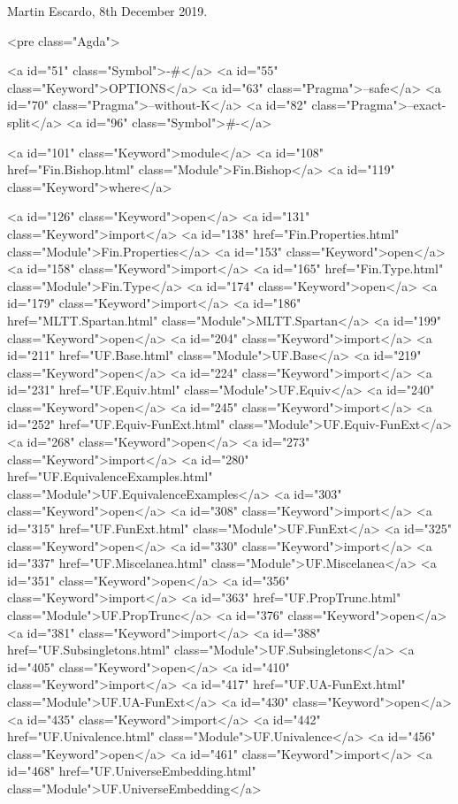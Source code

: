 Martin Escardo, 8th December 2019.

<pre class="Agda">

<a id="51" class="Symbol">{-#</a> <a id="55" class="Keyword">OPTIONS</a> <a id="63" class="Pragma">--safe</a> <a id="70" class="Pragma">--without-K</a> <a id="82" class="Pragma">--exact-split</a> <a id="96" class="Symbol">#-}</a>

<a id="101" class="Keyword">module</a> <a id="108" href="Fin.Bishop.html" class="Module">Fin.Bishop</a> <a id="119" class="Keyword">where</a>

<a id="126" class="Keyword">open</a> <a id="131" class="Keyword">import</a> <a id="138" href="Fin.Properties.html" class="Module">Fin.Properties</a>
<a id="153" class="Keyword">open</a> <a id="158" class="Keyword">import</a> <a id="165" href="Fin.Type.html" class="Module">Fin.Type</a>
<a id="174" class="Keyword">open</a> <a id="179" class="Keyword">import</a> <a id="186" href="MLTT.Spartan.html" class="Module">MLTT.Spartan</a>
<a id="199" class="Keyword">open</a> <a id="204" class="Keyword">import</a> <a id="211" href="UF.Base.html" class="Module">UF.Base</a>
<a id="219" class="Keyword">open</a> <a id="224" class="Keyword">import</a> <a id="231" href="UF.Equiv.html" class="Module">UF.Equiv</a>
<a id="240" class="Keyword">open</a> <a id="245" class="Keyword">import</a> <a id="252" href="UF.Equiv-FunExt.html" class="Module">UF.Equiv-FunExt</a>
<a id="268" class="Keyword">open</a> <a id="273" class="Keyword">import</a> <a id="280" href="UF.EquivalenceExamples.html" class="Module">UF.EquivalenceExamples</a>
<a id="303" class="Keyword">open</a> <a id="308" class="Keyword">import</a> <a id="315" href="UF.FunExt.html" class="Module">UF.FunExt</a>
<a id="325" class="Keyword">open</a> <a id="330" class="Keyword">import</a> <a id="337" href="UF.Miscelanea.html" class="Module">UF.Miscelanea</a>
<a id="351" class="Keyword">open</a> <a id="356" class="Keyword">import</a> <a id="363" href="UF.PropTrunc.html" class="Module">UF.PropTrunc</a>
<a id="376" class="Keyword">open</a> <a id="381" class="Keyword">import</a> <a id="388" href="UF.Subsingletons.html" class="Module">UF.Subsingletons</a>
<a id="405" class="Keyword">open</a> <a id="410" class="Keyword">import</a> <a id="417" href="UF.UA-FunExt.html" class="Module">UF.UA-FunExt</a>
<a id="430" class="Keyword">open</a> <a id="435" class="Keyword">import</a> <a id="442" href="UF.Univalence.html" class="Module">UF.Univalence</a>
<a id="456" class="Keyword">open</a> <a id="461" class="Keyword">import</a> <a id="468" href="UF.UniverseEmbedding.html" class="Module">UF.UniverseEmbedding</a>

